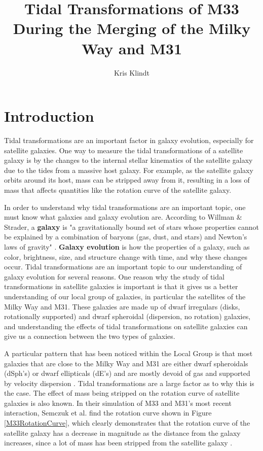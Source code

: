 \documentclass[trackchanges, twocolumn]{aastex7}
\begin{document}
\title{Tidal Transformations of M33 During the Merging of the Milky Way and M31}

\author{Kris Klindt}


\section{Introduction} 

Tidal transformations are an important factor in galaxy evolution, especially for satellite galaxies. One way to measure the tidal transformations of a satellite galaxy is by the changes to the internal stellar kinematics of the satellite galaxy due to the tides from a massive host galaxy. For example, as the satellite galaxy orbits around its host, mass can be stripped away from it, resulting in a loss of mass that affects quantities like the rotation curve of the satellite galaxy. 

In order to understand why tidal transformations are an important topic, one must know what galaxies and galaxy evolution are. According to Willman \& Strader, a \textbf{galaxy} is "a gravitationally bound set of stars whose properties cannot be explained by a combination of baryons (gas, dust, and stars) and Newton's laws of gravity" \citep{Willman2012}. \textbf{Galaxy evolution} is how the properties of a galaxy, such as color, brightness, size, and structure change with time, and why these changes occur. Tidal transformations are an important topic to our understanding of galaxy evolution for several reasons. One reason why the study of tidal transformations in satellite galaxies is important is that it gives us a better understanding of our local group of galaxies, in particular the satellites of the Milky Way and M31. These galaxies are made up of dwarf irregulars (disks, rotationally supported) and dwarf spheroidal (dispersion, no rotation) galaxies, and understanding the effects of tidal transformations on satellite galaxies can give us a connection between the two types of galaxies.

A particular pattern that has been noticed within the Local Group is that most galaxies that are close to the Milky Way and M31 are either dwarf spheroidals (dSph’s) or dwarf ellipticals (dE's) and are mostly devoid of gas and supported by velocity dispersion \citep{Mayer2001}. Tidal transformations are a large factor as to why this is the case. The effect of mass being stripped on the rotation curve of satellite galaxies is also known. In their simulation of M33 and M31's most recent interaction, Semczuk et al. find the rotation curve shown in Figure \ref{M33RotationCurve}, which clearly demonstrates that the rotation curve of the satellite galaxy has a decrease in magnitude as the distance from the galaxy increases, since a lot of mass has been stripped from the satellite galaxy \citep{Semczuk2018}.
\end{document}
